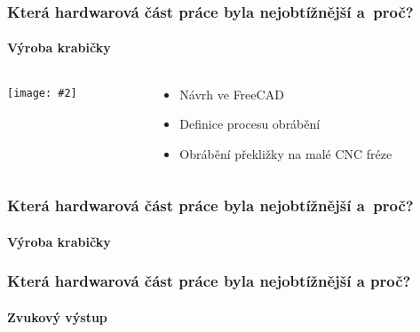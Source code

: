 \documentclass[
    utf8,
    aspectratio=169,
    17pt,  %
]{beamer}
\newcommand{\fullsizegraphics}[2][]{%
    \centering%
    \texttt{[image: \#2]}%
}
\begin{document}
\begin{frame}[fragile]  %
    \frametitle{Která hardwarová část práce byla nejobtížnější a~proč?}
    \framesubtitle{Výroba krabičky}
    \begin{columns}
        \begin{column}{0.5\textwidth}
            \fullsizegraphics[bb=0px 430px 2200px 1918px, clip]{final-front}
        \end{column}
        \begin{column}{0.5\textwidth}
            \begin{itemize}
                \item Návrh ve FreeCAD
                \item Definice procesu obrábění
                \item Obrábění překližky na malé CNC fréze
            \end{itemize}
        \end{column}
    \end{columns}
\end{frame}

\begin{frame}
    \frametitle{Která hardwarová část práce byla nejobtížnější a~proč?}
    \framesubtitle{Výroba krabičky}
    \only<1>{\fullsizegraphics{krabicka-CNC-repro}}
    \only<2>{\fullsizegraphics{krabicka-CNC-laser}}
    \only<3>{\fullsizegraphics{krabicka-CNC-poskozeni}}
\end{frame}


\begin{frame}
    \frametitle{Která hardwarová část práce byla nejobtížnější a proč?}
    \framesubtitle{Zvukový výstup}
    \only<2>{\fullsizegraphics{zvuk-stul2}}
\end{frame}
\end{document}
